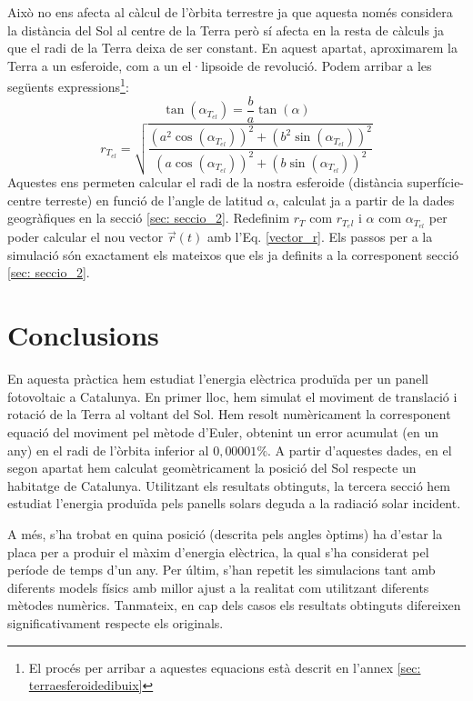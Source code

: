\documentclass[11pt]{article}
\begin{document}
Això no ens afecta al càlcul de l'òrbita terrestre ja que aquesta només considera la distància del Sol al centre de la Terra però sí afecta en la resta de càlculs ja que el radi de la Terra deixa de ser constant. En aquest apartat, aproximarem la Terra a un esferoide, com a un el·lipsoide de revolució. Podem arribar a les següents expressions\footnote{El procés per arribar a aquestes equacions està descrit en l'annex \ref{sec: terraesferoidedibuix}}:
\begin{equation}
    \tan(\alpha_{T_{el}}) = \frac{b}{a}\tan(\alpha) 
    \label{eq: alphatel}
\end{equation}
\begin{equation}
    r_{T_{el}} = \sqrt{\frac{(a^2\cos(\alpha_{T_{el}}))^2+(b^2\sin(\alpha_{T_{el}}))^2}{(a\cos(\alpha_{T_{el}}))^2+(b\sin(\alpha_{T_{el}}))^2}}
    \label{eq: rtel}
\end{equation}
Aquestes ens permeten calcular el radi de la nostra esferoide (distància superfície-centre terreste) en funció de l'angle de latitud $\alpha$, calculat ja a partir de la dades geogràfiques en la secció \ref{sec: seccio_2}. Redefinim $r_T$ com $r_{T_el}$ i $\alpha$ com $\alpha_{T_{el}}$ per poder calcular el nou vector $\vec{r}{(t)}$ amb l'Eq. \eqref{vector_r}. Els passos per a la simulació són exactament els mateixos que els ja definits a la corresponent secció \ref{sec: seccio_2}.

\section{Conclusions}
En aquesta pràctica hem estudiat l'energia elèctrica produïda per un panell fotovoltaic a Catalunya. En primer lloc, hem simulat el moviment de translació i rotació de la Terra al voltant del Sol. Hem resolt numèricament la corresponent equació del moviment pel mètode d'Euler, obtenint un error acumulat (en un any) en el radi de l'òrbita inferior al $0,00001\%$. A partir d'aquestes dades, en el segon apartat hem calculat geomètricament la posició del Sol respecte un habitatge de Catalunya. Utilitzant els resultats obtinguts, la tercera secció hem estudiat l'energia produïda pels panells solars deguda a la radiació solar incident.

A més, s'ha trobat en quina posició (descrita pels angles òptims) ha d'estar la placa per a produir el màxim d'energia elèctrica, la qual s'ha considerat pel període de temps d'un any. Per últim, s'han repetit les simulacions tant amb diferents models físics amb millor ajust a la realitat com utilitzant diferents mètodes numèrics. Tanmateix, en cap dels casos els resultats obtinguts difereixen significativament respecte els originals.
\end{document}
